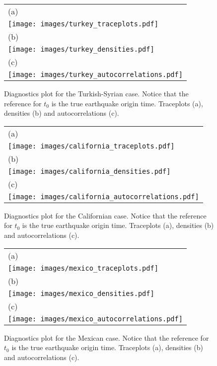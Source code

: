 \documentclass[final]{statsoc}
\begin{document}
\begin{appendix}
    \begin{figure}[htbp!]
        \centering
        \begin{tabular}{l}
            (a) \\
            \texttt{[image: images/turkey\_traceplots.pdf]} \\
            (b) \\
            \texttt{[image: images/turkey\_densities.pdf]} \\
            (c) \\
            \texttt{[image: images/turkey\_autocorrelations.pdf]}
        \end{tabular}
        \caption{Diagnostics plot for the Turkish-Syrian case. Notice that the reference for $t_0$ is the true earthquake origin time. Traceplots (a), densities (b) and autocorrelations (c).}
        \label{fig:turkey_diagn}
    \end{figure}

   
    \begin{figure}[htbp!]
        \centering
        \begin{tabular}{l}
            (a) \\
            \texttt{[image: images/california\_traceplots.pdf]} \\
            (b) \\
            \texttt{[image: images/california\_densities.pdf]} \\
            (c) \\
            \texttt{[image: images/california\_autocorrelations.pdf]}
        \end{tabular}
        \caption{Diagnostics plot for the Californian case. Notice that the reference for $t_0$ is the true earthquake origin time. Traceplots (a), densities (b) and autocorrelations (c).}
        \label{fig:california_diagn}
    \end{figure}

    \begin{figure}[htbp!]
        \centering
        \begin{tabular}{l}
            (a) \\
            \texttt{[image: images/mexico\_traceplots.pdf]} \\
            (b) \\
            \texttt{[image: images/mexico\_densities.pdf]} \\
            (c) \\
            \texttt{[image: images/mexico\_autocorrelations.pdf]}
        \end{tabular}
        \caption{Diagnostics plot for the Mexican case. Notice that the reference for $t_0$ is the true earthquake origin time. Traceplots (a), densities (b) and autocorrelations (c).}
        \label{fig:mexico_diagn}
    \end{figure}
    
\end{appendix}

\newpage



\end{document}

